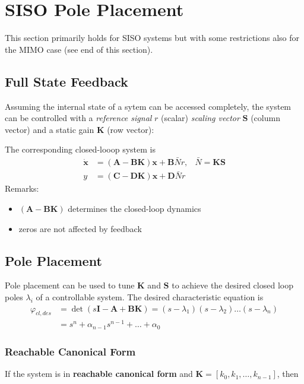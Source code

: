 \section{SISO Pole Placement}
This section primarily holds for SISO systems but with some restrictions also for the MIMO case (see end of this section).
\subsection{Full State Feedback}
Assuming the internal state of a sytem can be accessed completely, the system can be controlled
with a \textit{reference signal} $r$ (scalar) \textit{scaling vector} $\mathbf{S}$ (column vector) and a static gain $\mathbf{K}$ (row vector):
\begin{center}
    
\end{center}
The corresponding closed-looop system is
\noindent\begin{align*}
    \dot{\mathbf{x}} & =(\mathbf{A}-\mathbf{BK})\mathbf{x}+\mathbf{B}\bar{N}r, & \bar{N}=\mathbf{KS} \\
    y                & =(\mathbf{C}-\mathbf{DK})\mathbf{x} +\mathbf{D}\bar{N}r
\end{align*}
Remarks:
\begin{itemize}
    \item $(\mathbf{A}-\mathbf{BK})$ determines the closed-loop dynamics
    \item zeros are not affected by feedback
\end{itemize}

\subsection{Pole Placement}\label{sec:pole_placement}
Pole placement can be used to tune $\mathbf{K}$ and $\mathbf{S}$ to achieve the desired closed loop poles $\lambda_i$ of a controllable system.
The desired characteristic equation is
\noindent\begin{align*}
    \varphi_{cl,des} & =\det{(s\mathbf{I}-\mathbf{A}+\mathbf{BK})}=(s-\lambda_1)(s-\lambda_2)\ldots(s-\lambda_n) \\
                     & =s^n+\alpha_{n-1}s^{n-1}+\ldots+\alpha_0
\end{align*}

\subsubsection{Reachable Canonical Form}
If the system is in \textbf{reachable canonical form} and $\mathbf{K} = \left[k_0,k_1,\ldots,k_{n-1}\right]$, then

